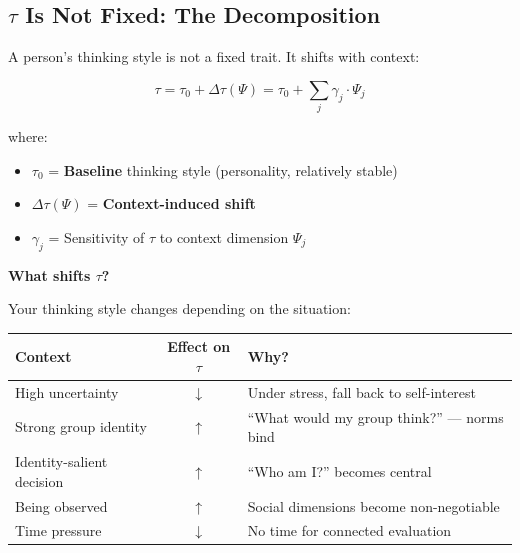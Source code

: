 \subsection{$\tau$ Is Not Fixed: The Decomposition}
\label{subsec:12-2-decomposition}

A person's thinking style is not a fixed trait. It shifts with context:

\begin{equation}
\boxed{\tau = \tau_0 + \Delta\tau(\Psi) = \tau_0 + \sum_j \gamma_j \cdot \Psi_j}
\label{eq:tau-decomposition}
\end{equation}

where:
\begin{itemize}
\item $\tau_0$ = \textbf{Baseline} thinking style (personality, relatively stable)
\item $\Delta\tau(\Psi)$ = \textbf{Context-induced shift}
\item $\gamma_j$ = Sensitivity of $\tau$ to context dimension $\Psi_j$
\end{itemize}

\begin{intuition}
\textbf{What shifts $\tau$?}

Your thinking style changes depending on the situation:

\begin{center}
\begin{tabular}{lcp{6cm}}
\toprule
\textbf{Context} & \textbf{Effect on $\tau$} & \textbf{Why?}\\
\midrule
High uncertainty & $\downarrow$ & Under stress, fall back to self-interest\\
Strong group identity & $\uparrow$ & ``What would my group think?'' — norms bind\\
Identity-salient decision & $\uparrow$ & ``Who am I?'' becomes central\\
Being observed & $\uparrow$ & Social dimensions become non-negotiable\\
Time pressure & $\downarrow$ & No time for connected evaluation\\
\bottomrule
\end{tabular}
\end{center}
\end{intuition}

